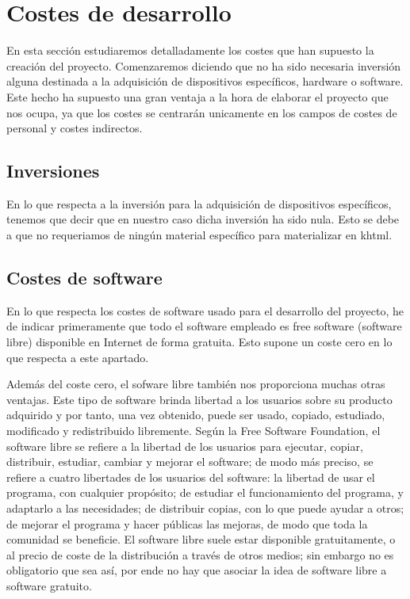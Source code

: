 \section{Costes de desarrollo}

En esta sección estudiaremos detalladamente los costes que han supuesto la creación del proyecto. Comenzaremos diciendo que no ha sido necesaria inversión alguna destinada a la adquisición de dispositivos específicos, hardware o software. Este hecho ha supuesto una gran ventaja a la hora de elaborar el proyecto que nos  ocupa, ya que los costes se centrarán unicamente en los campos de costes de personal y costes indirectos.
   
\subsection{Inversiones}

En lo que respecta a la inversión para la adquisición de dispositivos específicos, tenemos que decir que en nuestro caso dicha inversión ha sido nula. Esto se debe a que no requeriamos de ningún material específico para materializar en khtml.


\subsection{Costes de software}

En lo que respecta los costes de software usado para el desarrollo del proyecto, he de indicar primeramente que todo el software empleado es free software (software libre) disponible en Internet de forma gratuita. Esto supone un coste cero en lo que respecta a este apartado.
    
Además del coste cero, el sofware libre también nos proporciona muchas otras ventajas. Este tipo de software  brinda libertad a los usuarios sobre su producto adquirido y por tanto, una vez obtenido, puede ser usado, copiado, estudiado, modificado y redistribuido libremente. Según la Free Software Foundation, el software libre se refiere a la libertad de los usuarios para ejecutar, copiar, distribuir, estudiar, cambiar y mejorar el software; de modo más preciso, se refiere a cuatro libertades de los usuarios del software: la libertad de usar el programa, con cualquier propósito; de estudiar el funcionamiento del programa, y adaptarlo a las necesidades; de distribuir copias, con lo que puede ayudar a otros; de mejorar el programa y hacer públicas las mejoras, de modo que toda la comunidad se beneficie. El software libre suele estar disponible gratuitamente, o al precio de coste de la distribución a través de otros medios; sin embargo no es obligatorio que sea así, por ende no hay que asociar la idea de software libre a software gratuito.  
     
